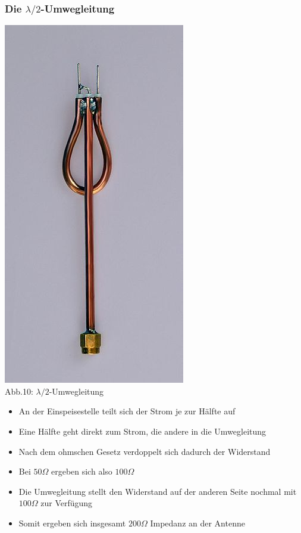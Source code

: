 \begin{frame}
\frametitle{Die $\lambda /2$-Umwegleitung}
\begin{minipage}{0.3\textwidth}
	\includegraphics[scale=0.3]{a10/Umwegleitung.jpg}\\
	Abb.10: $\lambda /2$-Umwegleitung \cite{wp}
\end{minipage}	
\hspace{2mm}
\begin{minipage}{0.5\textwidth}
	\begin{footnotesize}
	\begin{itemize}
		\item	An der Einspeisestelle teilt sich der Strom je zur Hälfte auf
		\item	Eine Hälfte geht direkt zum Strom, die andere in die Umwegleitung
		\item	Nach dem ohmschen Gesetz verdoppelt sich dadurch der Widerstand
		\item	Bei $50 \Omega$ ergeben sich also $100 \Omega$ 
		\item	Die Umwegleitung stellt den Widerstand auf der anderen Seite nochmal mit $100 \Omega$ zur Verfügung
		\item	Somit ergeben sich insgesamt $200 \Omega$ Impedanz an der Antenne
	\end{itemize}
	\end{footnotesize}
\end{minipage}
\end{frame}

